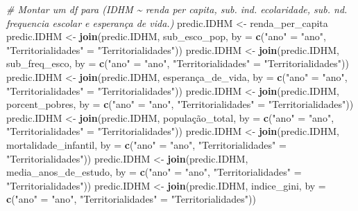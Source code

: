 \documentclass[
]{article}
\newenvironment{Shaded}{\begin{snugshade}}{\end{snugshade}}
\newcommand{\AttributeTok}[1]{\textcolor[rgb]{0.13,0.29,0.53}{#1}}
\newcommand{\CommentTok}[1]{\textcolor[rgb]{0.56,0.35,0.01}{\textit{#1}}}
\newcommand{\FunctionTok}[1]{\textcolor[rgb]{0.13,0.29,0.53}{\textbf{#1}}}
\newcommand{\NormalTok}[1]{#1}
\newcommand{\OtherTok}[1]{\textcolor[rgb]{0.56,0.35,0.01}{#1}}
\newcommand{\StringTok}[1]{\textcolor[rgb]{0.31,0.60,0.02}{#1}}
\begin{document}
\begin{Shaded}
\begin{Highlighting}[]
\CommentTok{\# Montar um df para (IDHM \textasciitilde{} renda per capita, sub. ind. ecolaridade, sub. nd. frequencia escolar e esperança de vida.)}
\NormalTok{predic.IDHM }\OtherTok{\textless{}{-}}\NormalTok{ renda\_per\_capita}
\NormalTok{predic.IDHM }\OtherTok{\textless{}{-}} \FunctionTok{join}\NormalTok{(predic.IDHM, sub\_esco\_pop, }\AttributeTok{by =} \FunctionTok{c}\NormalTok{(}\StringTok{"ano"} \OtherTok{=} \StringTok{"ano"}\NormalTok{, }\StringTok{"Territorialidades"} \OtherTok{=} \StringTok{"Territorialidades"}\NormalTok{))}
\NormalTok{predic.IDHM }\OtherTok{\textless{}{-}} \FunctionTok{join}\NormalTok{(predic.IDHM, sub\_freq\_esco, }\AttributeTok{by =} \FunctionTok{c}\NormalTok{(}\StringTok{"ano"} \OtherTok{=} \StringTok{"ano"}\NormalTok{, }\StringTok{"Territorialidades"} \OtherTok{=} \StringTok{"Territorialidades"}\NormalTok{))}
\NormalTok{predic.IDHM }\OtherTok{\textless{}{-}} \FunctionTok{join}\NormalTok{(predic.IDHM, esperança\_de\_vida, }\AttributeTok{by =} \FunctionTok{c}\NormalTok{(}\StringTok{"ano"} \OtherTok{=} \StringTok{"ano"}\NormalTok{, }\StringTok{"Territorialidades"} \OtherTok{=} \StringTok{"Territorialidades"}\NormalTok{))}
\NormalTok{predic.IDHM }\OtherTok{\textless{}{-}} \FunctionTok{join}\NormalTok{(predic.IDHM, porcent\_pobres, }\AttributeTok{by =} \FunctionTok{c}\NormalTok{(}\StringTok{"ano"} \OtherTok{=} \StringTok{"ano"}\NormalTok{, }\StringTok{"Territorialidades"} \OtherTok{=} \StringTok{"Territorialidades"}\NormalTok{))}
\NormalTok{predic.IDHM }\OtherTok{\textless{}{-}} \FunctionTok{join}\NormalTok{(predic.IDHM, população\_total, }\AttributeTok{by =} \FunctionTok{c}\NormalTok{(}\StringTok{"ano"} \OtherTok{=} \StringTok{"ano"}\NormalTok{, }\StringTok{"Territorialidades"} \OtherTok{=} \StringTok{"Territorialidades"}\NormalTok{))}
\NormalTok{predic.IDHM }\OtherTok{\textless{}{-}} \FunctionTok{join}\NormalTok{(predic.IDHM, mortalidade\_infantil, }\AttributeTok{by =} \FunctionTok{c}\NormalTok{(}\StringTok{"ano"} \OtherTok{=} \StringTok{"ano"}\NormalTok{, }\StringTok{"Territorialidades"} \OtherTok{=} \StringTok{"Territorialidades"}\NormalTok{))}
\NormalTok{predic.IDHM }\OtherTok{\textless{}{-}} \FunctionTok{join}\NormalTok{(predic.IDHM, media\_anos\_de\_estudo, }\AttributeTok{by =} \FunctionTok{c}\NormalTok{(}\StringTok{"ano"} \OtherTok{=} \StringTok{"ano"}\NormalTok{, }\StringTok{"Territorialidades"} \OtherTok{=} \StringTok{"Territorialidades"}\NormalTok{))}
\NormalTok{predic.IDHM }\OtherTok{\textless{}{-}} \FunctionTok{join}\NormalTok{(predic.IDHM, indice\_gini, }\AttributeTok{by =} \FunctionTok{c}\NormalTok{(}\StringTok{"ano"} \OtherTok{=} \StringTok{"ano"}\NormalTok{, }\StringTok{"Territorialidades"} \OtherTok{=} \StringTok{"Territorialidades"}\NormalTok{))}

\end{Highlighting}
\end{Shaded}
\end{document}

